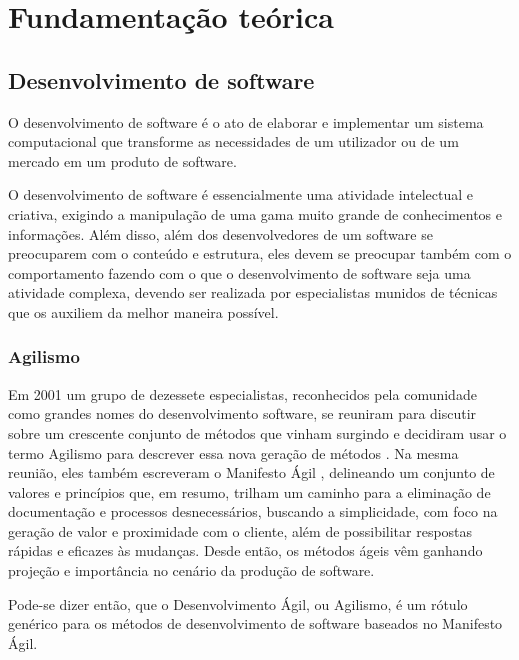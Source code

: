 \chapter{Fundamentação teórica}

\section{Desenvolvimento de software} %
\label{sec:desenvolvimento_de_software}

O desenvolvimento de software é o ato de elaborar e implementar um sistema computacional que transforme as necessidades de um utilizador ou de um mercado em um produto de software.

O desenvolvimento de software é essencialmente uma atividade intelectual e criativa, exigindo a manipulação de uma gama muito grande de conhecimentos e informações. Além disso, além dos desenvolvedores de um software se preocuparem com o conteúdo e estrutura, eles devem se preocupar também com o comportamento fazendo com o que o desenvolvimento de software seja uma atividade complexa, devendo ser realizada por especialistas munidos de técnicas que os auxiliem da melhor maneira possível.


\subsection{Agilismo} %
\label{sub:agilismo}

Em 2001 um grupo de dezessete especialistas, reconhecidos pela comunidade como grandes nomes do desenvolvimento software, se reuniram para discutir sobre um crescente conjunto de métodos que vinham surgindo e decidiram usar o termo Agilismo para descrever essa nova geração de métodos \cite{AgileStory}. Na mesma reunião, eles também escreveram o Manifesto Ágil \cite{AgileManifesto}, delineando um conjunto de valores e princípios que, em resumo, trilham um caminho para a eliminação de documentação e processos desnecessários, buscando a simplicidade, com foco na geração de valor e proximidade com o cliente, além de possibilitar respostas rápidas e eficazes às mudanças. Desde então, os métodos ágeis vêm ganhando projeção e importância no cenário da produção de software.

Pode-se dizer então, que o Desenvolvimento Ágil, ou Agilismo, é um rótulo genérico para os métodos de desenvolvimento de software baseados no Manifesto Ágil.

